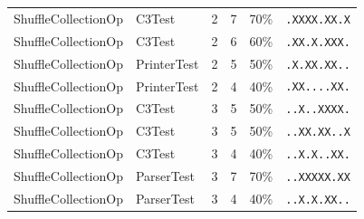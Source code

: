 \begin{table}[htbp]
\begin{tabular}{llrrrl}
ShuffleCollectionOp & C3Test & 2 & 7 & 70\% & \texttt{.XXXX.XX.X} \\
ShuffleCollectionOp & C3Test & 2 & 6 & 60\% & \texttt{.XX.X.XXX.} \\
ShuffleCollectionOp & PrinterTest & 2 & 5 & 50\% & \texttt{.X.XX.XX..} \\
ShuffleCollectionOp & PrinterTest & 2 & 4 & 40\% & \texttt{.XX....XX.} \\
ShuffleCollectionOp & C3Test & 3 & 5 & 50\% & \texttt{..X..XXXX.} \\
ShuffleCollectionOp & C3Test & 3 & 5 & 50\% & \texttt{..XX.XX..X} \\
ShuffleCollectionOp & C3Test & 3 & 4 & 40\% & \texttt{..X.X..XX.} \\
ShuffleCollectionOp & ParserTest & 3 & 7 & 70\% & \texttt{..XXXXX.XX} \\
ShuffleCollectionOp & ParserTest & 3 & 4 & 40\% & \texttt{..X.X.XX..} \\
\bottomrule
\end{tabular}
\end{table}
